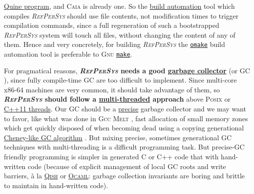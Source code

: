 \documentclass[11pt,a4paper,svgnames]{article}
\newcommand{\RefPerSys}{{\textit{\textsc{RefPerSys}}}}
\begin{document}
\href{https://en.wikipedia.org/wiki/Quine\_(computing)}{Quine
  program}, and \textsc{Caia} is already one. So the
\href{https://en.wikipedia.org/wiki/Build\_automation}{build
  automation} tool which compiles {\RefPerSys} should use file
contents, not modification times to trigger compilation commands,
since a full regeneration of such a bootstrapped {\RefPerSys} system
will touch all files, without changing the content of any of
them. Hence and very concretely, for building {\RefPerSys} the
\href{http://projects.camlcity.org/projects/omake.html}{\texttt{omake}}
build automation tool is preferable to \textsc{Gnu}
\href{https://www.gnu.org/software/make/}{\texttt{make}}.

For pragmatical reasons, \textbf{{\RefPerSys} needs a good
  \href{https://en.wikipedia.org/wiki/Tracing\_garbage\_collection}{garbage
    collector}} (or GC \cite{jones:2016:gchandbook}), since fully
compile-time GC \cite{mazur:2004:compile} are too difficult to
implement. Since multi-core x86-64 machines are very common, it should
take advantage of them, so \textbf{{\RefPerSys} should follow a
  \href{https://en.wikipedia.org/wiki/Thread_(computing)}{multi-threaded}
  approach} above \textsc{Posix} \cite{barney:2010:pthreads} or
\href{https://en.cppreference.com/w/cpp/thread}{C++11 threads}. Our GC
should be a
\href{https://en.wikipedia.org/wiki/Tracing_garbage_collection#Precise_vs._conservative_and_internal_pointers}{precise}
garbage collector \cite{Rafkind:2009:PreciseGC} and we may want to
favor, like what was done in \textsc{Gcc Melt}
\cite{Starynkevitch:2007:Multistage, Starynkevitch-DSL2011,
  Starynkevitch-GCCMELTweb}, fast allocation of small memory zones
which get quickly disposed of when becoming dead using a copying
generational
\href{https://en.wikipedia.org/wiki/Cheney's\_algorithm}{Cheney-like
  GC algorithm} \cite{wilson:1992:uniprocessorgc}.  But mixing
precise, sometimes generational GC techniques with multi-threading is
a difficult programming task. But precise-GC friendly programming is
simpler in generated C or C++ code that with hand-written code
(because of explicit management of local GC roots and write barriers,
à la
\href{http://starynkevitch.net/Basile/qishintro.html}{\textsc{Qish}}
or
\href{https://caml.inria.fr/pub/docs/manual-ocaml/intfc.html}{\textsc{Ocaml}}:
garbage collection invariants are boring and brittle to maintain in
hand-written code).
\end{document}

